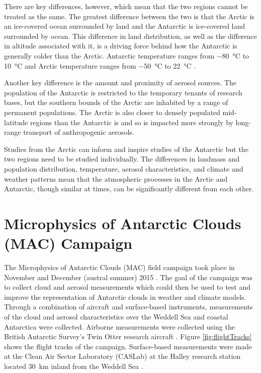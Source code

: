 There are key differences, however, which mean that the two regions cannot be treated as the same. The greatest difference between the two is that the Arctic is an ice-covered ocean surrounded by land and the Antarctic is ice-covered land surrounded by ocean. This difference in land distribution, as well as the difference in altitude associated with it, is a driving force behind how the Antarctic is generally colder than the Arctic. Antarctic temperature ranges from \SI{-80}{\degreeCelsius} to \SI{10}{\degreeCelsius} \citep{antwx, lach2010, brom2012} and Arctic temperature ranges from \SI{-50}{\degreeCelsius} to \SI{22}{\degreeCelsius} \citep{przy2016,kokh2020}.

Another key difference is the amount and proximity of aerosol sources. The population of the Antarctic is restricted to the temporary tenants of research bases, but the southern bounds of the Arctic are inhabited by a range of permanent populations. The Arctic is also closer to densely populated mid-latitude regions than the Antarctic is and so is impacted more strongly by long-range transport of anthropogenic aerosols. \citep{przy2016,kokh2020}

Studies from the Arctic can inform and inspire studies of the Antarctic but the two regions need to be studied individually. The differences in landmass and population distribution, temperature, aerosol characteristics, and climate and weather patterns mean that the atmospheric processes in the Arctic and Antarctic, though similar at times, can be significantly different from each other.

\section{Microphysics of Antarctic Clouds (MAC) Campaign} \label{ch:mac}
The Microphysics of Antarctic Clouds (MAC) field campaign took place in November and December (austral summer) 2015 \citep{oshea2017}. The goal of the campaign was to collect cloud and aerosol measurements which could then be used to test and improve the representation of Antarctic clouds in weather and climate models. Through a combination of aircraft and surface-based instruments, measurements of the cloud and aerosol characteristics over the Weddell Sea and coastal Antarctica were collected. Airborne measurements were collected using the British Antarctic Survey's Twin Otter research aircraft \citep{king2008}. Figure \ref{fig:flightTracks} shows the flight tracks of the campaign. Surface-based measurements were made at the Clean Air Sector Laboratory (CASLab) at the Halley research station located \SI{30}{km} inland from the Weddell Sea \citep{craw2017}.

